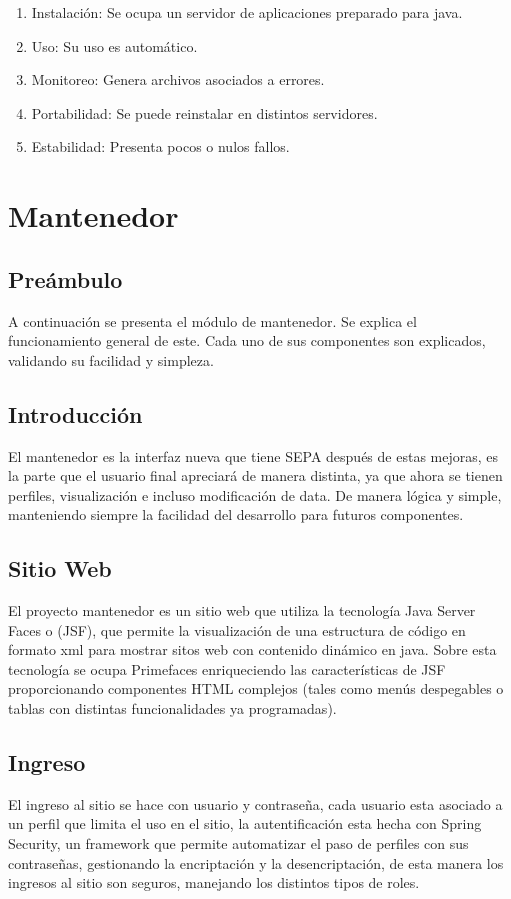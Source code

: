 \documentclass[a4paper,12pt,openany,oneside]{book}
\begin{document}
\begin{enumerate}

\item Instalación: Se ocupa un servidor de aplicaciones preparado para java.
\item Uso: Su uso es automático.
\item Monitoreo: Genera archivos asociados a errores.
\item Portabilidad: Se puede reinstalar en distintos servidores.
\item Estabilidad: Presenta pocos o nulos fallos.

\end{enumerate}

\chapter{Mantenedor}
\thispagestyle{empty}
\section{Preámbulo}
A continuación se presenta el módulo de mantenedor. Se explica el funcionamiento general de este. Cada uno de sus componentes son explicados, validando su facilidad y simpleza.
\section{Introducción}

El mantenedor es la interfaz nueva que tiene SEPA después de estas mejoras, es la parte que el usuario final apreciará de manera distinta, ya que ahora se tienen perfiles, visualización e incluso modificación de data. De manera lógica y simple, manteniendo siempre la facilidad del desarrollo para futuros componentes.

\section{Sitio Web}
El proyecto mantenedor es un sitio web que utiliza la tecnología Java Server Faces o (JSF), que permite la visualización de una estructura de código en formato xml para mostrar sitos web con contenido dinámico en java. Sobre esta tecnología se ocupa Primefaces enriqueciendo las características de JSF proporcionando componentes HTML complejos (tales como menús despegables o tablas con distintas funcionalidades ya programadas).
\section{Ingreso}
El ingreso al sitio se hace con usuario y contraseña, cada usuario esta asociado a un perfil que limita el uso en el sitio, la autentificación esta hecha con Spring Security, un framework que permite automatizar el paso de perfiles con sus contraseñas, gestionando la encriptación y la desencriptación, de esta manera los ingresos al sitio son seguros, manejando los distintos tipos de roles.
\end{document}
